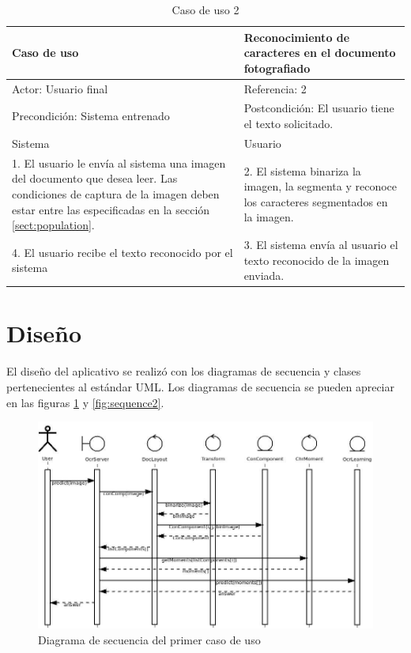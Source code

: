 \documentclass[a4paper, 11pt, oneside]{report}
\begin{document}
\begin{table}
\begin{center}
\begin{tabular}{|p{6cm}|p{6cm}|}
	\hline
	Caso de uso & Reconocimiento de caracteres en el documento fotografiado\\
	\hline
	Actor: Usuario final & Referencia: 2 \\
	\hline
	Precondición: Sistema entrenado & Postcondición: El usuario tiene el texto solicitado. \\
	\hline
	Sistema & Usuario \\
	\hline
	1. El usuario le envía al sistema una imagen del documento que desea leer. Las condiciones de captura de la imagen deben estar entre las especificadas en la sección \ref{sect:population}. &
	2. El sistema binariza la imagen, la segmenta y reconoce los caracteres segmentados en la imagen. \\
	\hline
	4. El usuario recibe el texto reconocido por el sistema &
	3. El sistema envía al usuario el texto reconocido de la imagen enviada. \\
	\hline
\end{tabular}
\end{center}
\caption{Caso de uso 2}	
\label{tb:uc2}
\end{table}

\section{Diseño}

El diseño del aplicativo se realizó con los diagramas de secuencia y clases pertenecientes al estándar UML. Los diagramas de secuencia se pueden apreciar en las figuras \ref{fig:sequence1} y \ref{fig:sequence2}.

\begin{figure}
\begin{center}
\includegraphics[width=20cm]{diagrams/sequence1.jpeg}
\end{center}
\caption{Diagrama de secuencia del primer caso de uso}
\label{fig:sequence1}
\end{figure}
\end{document}
